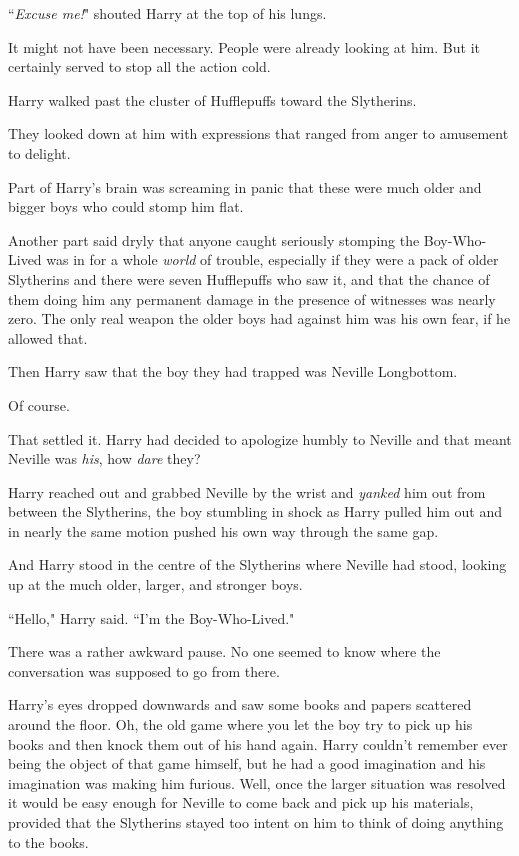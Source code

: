 ``\emph{Excuse me!}" shouted Harry at the top of his lungs.

It might not have been necessary. People were already looking at him. But it certainly served to stop all the action cold.

Harry walked past the cluster of Hufflepuffs toward the Slytherins.

They looked down at him with expressions that ranged from anger to amusement to delight.

Part of Harry's brain was screaming in panic that these were much older and bigger boys who could stomp him flat.

Another part said dryly that anyone caught seriously stomping the Boy-Who-Lived was in for a whole \emph{world} of trouble, especially if they were a pack of older Slytherins and there were seven Hufflepuffs who saw it, and that the chance of them doing him any permanent damage in the presence of witnesses was nearly zero. The only real weapon the older boys had against him was his own fear, if he allowed that.

Then Harry saw that the boy they had trapped was Neville Longbottom.

Of course.

That settled it. Harry had decided to apologize humbly to Neville and that meant Neville was \emph{his}, how \emph{dare} they?

Harry reached out and grabbed Neville by the wrist and \emph{yanked} him out from between the Slytherins, the boy stumbling in shock as Harry pulled him out and in nearly the same motion pushed his own way through the same gap.

And Harry stood in the centre of the Slytherins where Neville had stood, looking up at the much older, larger, and stronger boys.

``Hello," Harry said. ``I'm the Boy-Who-Lived."

There was a rather awkward pause. No one seemed to know where the conversation was supposed to go from there.

Harry's eyes dropped downwards and saw some books and papers scattered around the floor. Oh, the old game where you let the boy try to pick up his books and then knock them out of his hand again. Harry couldn't remember ever being the object of that game himself, but he had a good imagination and his imagination was making him furious. Well, once the larger situation was resolved it would be easy enough for Neville to come back and pick up his materials, provided that the Slytherins stayed too intent on him to think of doing anything to the books.

